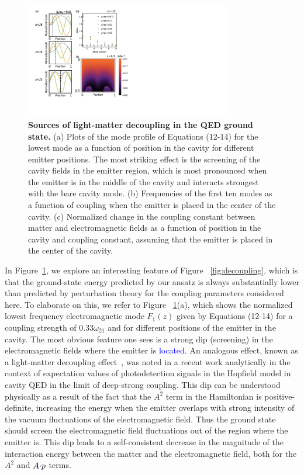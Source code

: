 \documentclass[aps,prb,twocolumn,
	groupedaddress,superscriptaddress,
	amsfonts,amssymb,amsmath,floatfix,
	citeautoscript]{revtex4-1}
\newcommand{\Jadd}[1]{\textcolor{blue}{#1}}
\begin{document}
\begin{figure}[t]
\includegraphics[width=9cm]{fig3.pdf}
\caption{\textbf{Sources of light-matter decoupling in the QED ground state.} (a) Plots of the mode profile of Equations (12-14) for the lowest mode as a function of position in the cavity for different emitter positions. The most striking effect is the screening of the cavity fields in the emitter region, which is most pronounced when the emitter is in the middle of the cavity and interacts strongest with the bare cavity mode. (b) Frequencies of the first ten modes as a function of coupling when the emitter is placed in the center of the cavity. (c) Normalized change in the coupling constant between matter and electromagnetic fields as a function of position in the cavity and coupling constant, assuming that the emitter is placed in the center of the cavity.  }
\label{fig:sources_decoupling}
\end{figure}

In Figure~\ref{fig:sources_decoupling}, we explore an interesting feature of Figure ~\ref{fig:decoupling}, which is that the ground-state energy predicted by our ansatz is always substantially lower than predicted by perturbation theory for the coupling parameters considered here. To elaborate on this, we refer to Figure ~\ref{fig:sources_decoupling}(a), which shows the normalized lowest frequency electromagnetic mode $F_1(z)$ given by Equations (12-14) for a coupling strength of $0.33\omega_{21}$ and for different positions of the emitter in the cavity. The most obvious feature one sees is a strong dip (screening) in the electromagnetic fields where the emitter is \Jadd{located}. An analogous effect, known as a light-matter decoupling effect~\cite{liberato2014,garcia2015light,bayer2017terahertz}, was noted in a recent work analytically in the context of expectation values of photodetection signals in the Hopfield model in cavity QED in the limit of deep-strong coupling. This dip can be understood physically as a result of the fact that the $A^2$ term in the Hamiltonian is positive-definite, increasing the energy when the emitter overlaps with strong intensity of the vacuum fluctuations of the electromagnetic field. Thus the ground state should screen the electromagnetic field fluctuations out of the region where the emitter is. This dip leads to a self-consistent decrease in the magnitude of the interaction energy between the matter and the electromagnetic field, both for the $A^2$ and $A\Jadd{\cdot}p$ terms. 
\end{document}
